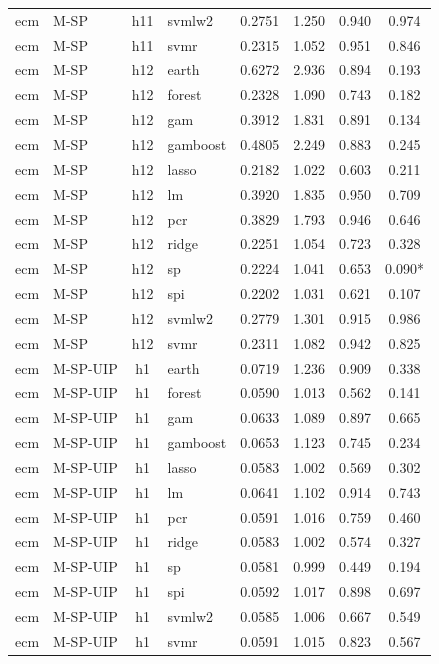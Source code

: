 \begin{ThreePartTable}
\begin{longtable}[t]{llclcccc}
ecm & M-SP & h11 & svmlw2 & 0.2751 & 1.250 & 0.940 & 0.974\\
ecm & M-SP & h11 & svmr & 0.2315 & 1.052 & 0.951 & 0.846\\
\addlinespace
ecm & M-SP & h12 & earth & 0.6272 & 2.936 & 0.894 & 0.193\\
ecm & M-SP & h12 & forest & 0.2328 & 1.090 & 0.743 & 0.182\\
ecm & M-SP & h12 & gam & 0.3912 & 1.831 & 0.891 & 0.134\\
ecm & M-SP & h12 & gamboost & 0.4805 & 2.249 & 0.883 & 0.245\\
ecm & M-SP & h12 & lasso & 0.2182 & 1.022 & 0.603 & 0.211\\
ecm & M-SP & h12 & lm & 0.3920 & 1.835 & 0.950 & 0.709\\
ecm & M-SP & h12 & pcr & 0.3829 & 1.793 & 0.946 & 0.646\\
ecm & M-SP & h12 & ridge & 0.2251 & 1.054 & 0.723 & 0.328\\
ecm & M-SP & h12 & sp & 0.2224 & 1.041 & 0.653 & 0.090*\\
ecm & M-SP & h12 & spi & 0.2202 & 1.031 & 0.621 & 0.107\\
ecm & M-SP & h12 & svmlw2 & 0.2779 & 1.301 & 0.915 & 0.986\\
ecm & M-SP & h12 & svmr & 0.2311 & 1.082 & 0.942 & 0.825\\
\addlinespace
ecm & M-SP-UIP & h1 & earth & 0.0719 & 1.236 & 0.909 & 0.338\\
ecm & M-SP-UIP & h1 & forest & 0.0590 & 1.013 & 0.562 & 0.141\\
ecm & M-SP-UIP & h1 & gam & 0.0633 & 1.089 & 0.897 & 0.665\\
ecm & M-SP-UIP & h1 & gamboost & 0.0653 & 1.123 & 0.745 & 0.234\\
ecm & M-SP-UIP & h1 & lasso & 0.0583 & 1.002 & 0.569 & 0.302\\
ecm & M-SP-UIP & h1 & lm & 0.0641 & 1.102 & 0.914 & 0.743\\
ecm & M-SP-UIP & h1 & pcr & 0.0591 & 1.016 & 0.759 & 0.460\\
ecm & M-SP-UIP & h1 & ridge & 0.0583 & 1.002 & 0.574 & 0.327\\
ecm & M-SP-UIP & h1 & sp & 0.0581 & 0.999 & 0.449 & 0.194\\
ecm & M-SP-UIP & h1 & spi & 0.0592 & 1.017 & 0.898 & 0.697\\
ecm & M-SP-UIP & h1 & svmlw2 & 0.0585 & 1.006 & 0.667 & 0.549\\
ecm & M-SP-UIP & h1 & svmr & 0.0591 & 1.015 & 0.823 & 0.567\\

\end{longtable}
\end{ThreePartTable}

